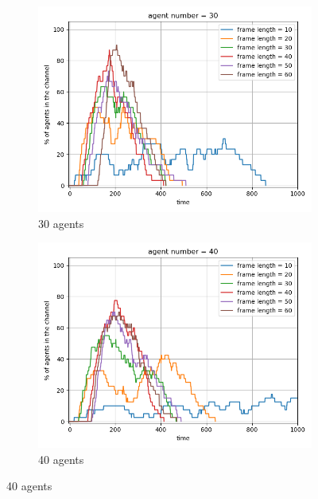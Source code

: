 {\begin{figure}[htb]
    \vspace{1cm}
    
    \begin{subfigure}[t]{0.45\linewidth}
        \centering
        \includegraphics[width=\linewidth]{figures/channel_usage_agent30.png}
        \caption{30 agents}
        \label{fig:agentpercent3}
    \end{subfigure}
    \hfill
    \begin{subfigure}[t]{0.45\linewidth}
        \centering
        \includegraphics[width=\linewidth]{figures/channel_usage_agent40.png}
        \caption{40 agents}
        \label{fig:agentpercent4}
    \end{subfigure}
    

\end{figure}}
